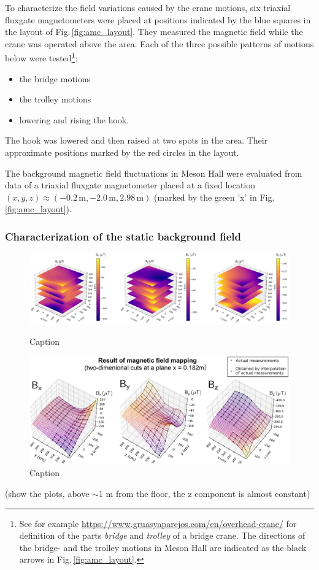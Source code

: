 To characterize the field variations caused by the crane motions, six triaxial fluxgate magnetometers were placed at positions indicated by the blue squares in the layout of  Fig.\,\ref{fig:amc_layout}. They measured the magnetic field while the crane was operated above the area.  Each of the three possible patterns of motions below were tested\footnote{See for example \url{https://www.gruasyaparejos.com/en/overhead-crane/} for definition of the parts \textit{bridge} and \textit{trolley} of a bridge crane.  The directions of the bridge- and the trolley motions in Meson Hall are indicated as the black arrows in  Fig.\,\ref{fig:amc_layout}.}: 
\begin{itemize}
\item the bridge motions  
\item the trolley motions 
\item lowering and rising the hook.
\end{itemize}
The hook was lowered and then raised at two spots in the area. Their approximate positions marked by the red circles in the layout. 

The background magnetic field fluctuations in Meson Hall were evaluated from data of a triaxial fluxgate magnetometer placed at a fixed location $(x,y,z) \approx (-0.2\,\mathrm{m}, -2.0\,\mathrm{m}, 2.98\,\mathrm{m})$ (marked by the green 'x' in Fig.\,\ref{fig:amc_layout}).


 





\subsubsection*{Characterization of the static background field}
\begin{figure}[htb!]
    \centering
    \includegraphics[width=1.03\textwidth]{graphics/AMC/B-field_3D.png}
    \caption{Caption}
    \label{fig:amc_B-map_3D}
    \vspace{1em}
    \includegraphics[width=\textwidth]{graphics/AMC/B-field_cut_CDR.pdf}
    \caption{Caption}
    \label{fig:amc_B-map_cut}
\end{figure}
(show the plots, above $\sim$1 m from the floor, the z component is almost constant)

